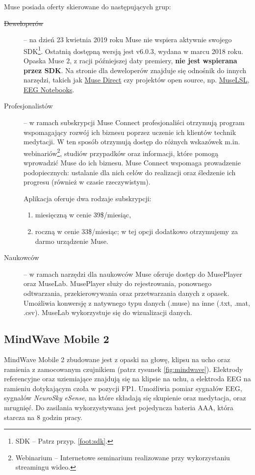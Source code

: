 \documentclass[skorowidz,skroty]{dyplomWEZUT}
\begin{document}
Muse posiada oferty skierowane do następujących grup:
\begin{description}
    \item [\sout{Deweloperów}] -- na dzień 23 kwietnia 2019 roku Muse nie wspiera aktywnie swojego SDK\footnote{SDK -- Patrz przyp. \vref{foot:sdk}.}. Ostatnią dostępną wersją jest v6.0.3, wydana w marcu 2018 roku. Opaska Muse 2, z racji późniejszej daty premiery, \textbf{nie jest wspierana przez SDK}. Na stronie dla deweloperów\cite{muse_developer} znajduje się odnośnik do innych narzędzi, takich jak \href{https://choosemuse.com/muse-direct/}{Muse Direct} czy projektów open source, np. \href{https://github.com/alexandrebarachant/muse-lsl}{MuseLSL}, \href{https://github.com/NeuroTechX/eeg-notebooks}{EEG Notebooks}.

    \item [Profesjonalistów] -- w ramach subskrypcji Muse Connect profesjonaliści otrzymują program wspomagający rozwój ich biznesu poprzez uczenie ich klientów technik medytacji\cite{muse_professional}. W ten sposób otrzymują dostęp do różnych wskazówek m.in. webinariów\footnote{Webinarium -- Internetowe seminarium realizowane przy wykorzystaniu streamingu wideo.}, studiów przypadków oraz informacji, które pomogą wprowadzić Muse do ich biznesu. Muse Connect wspomaga prowadzenie podopiecznych: ustalanie dla nich celów do realizacji oraz śledzenie ich progresu (również w czasie rzeczywistym).

    Aplikacja oferuje dwa rodzaje subskrypcji:
    \begin{enumerate}
        \item miesięczną w cenie 39\$/miesiąc,
        \item roczną w cenie 33\$/miesiąc; w tej opcji dodatkowo otrzymujemy za darmo urządzenie Muse.
    \end{enumerate}

    \item [Naukowców] -- w ramach narzędzi dla naukowców Muse oferuje dostęp do MusePlayer oraz MuseLab. MusePlayer służy do rejestrowania, ponownego odtwarzania, przekierowywania oraz przetwarzania danych z opasek. Umożliwia konwersję z natywnego typu danych (.muse) na inne (.txt, .mat, .csv). MuseLab wykorzystuje się do wizualizacji danych.
\end{description}

\FloatBarrier
\subsection{MindWave Mobile 2}
MindWave Mobile 2 zbudowane jest z opaski na głowę, klipsu na ucho oraz ramienia z zamocowanym czujnikiem (patrz rysunek \vref{fig:mindwave}). Elektrody referencyjne oraz uziemiające znajdują się na klipsie na uchu, a elektroda EEG na ramieniu dotykającym czoła w pozycji FP1. Umożliwia pomiar sygnałów EEG, sygnałów \textit{NeuroSky eSense}, na które składają się skupienie oraz medytacja, oraz mrugnięć. Do zasilania wykorzystywana jest pojedyncza bateria AAA, która starcza na 8 godzin pracy\cite{mindwave}.
\end{document}
